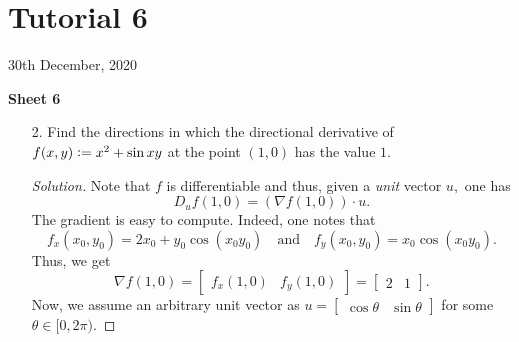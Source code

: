 \documentclass[12pt]{article}
\theoremstyle{definition}
\newenvironment{soln}{\begin{proof}[Solution]}{\end{proof}}
\begin{document}
\newpage\section{Tutorial 6}
\begin{center}
	30th December, 2020
\end{center}
\textbf{Sheet 6}
\begin{itemize}
	\item[2.] Find the directions in which the directional derivative of $f(x, y) \vcentcolon= x^2 + \sin xy$ at the point $(1, 0)$ has the value $1.$
	\begin{soln}
		Note that $f$ is differentiable and thus, given a \emph{unit} vector $u,$ one has
		\begin{equation*} 
			D_uf(1, 0) = (\nabla f(1, 0))\cdot u.
		\end{equation*}
		The gradient is easy to compute. Indeed, one notes that
		\begin{equation*} 
			f_x(x_0, y_0) = 2x_0 + y_0\cos(x_0y_0) \quad\text{and}\quad f_y(x_0, y_0) = x_0\cos(x_0y_0).
		\end{equation*}
		Thus, we get
		\begin{equation*} 
			\nabla f(1, 0) = \begin{bmatrix}
				f_x(1, 0) & f_y(1, 0)
			\end{bmatrix} = \begin{bmatrix}
				2 & 1
			\end{bmatrix}.
		\end{equation*}
		Now, we assume an arbitrary unit vector as $u = \begin{bmatrix}
			\cos \theta & \sin \theta
		\end{bmatrix}$ for some $\theta \in [0, 2\pi).$


\end{soln}
\end{itemize}
\end{document}
